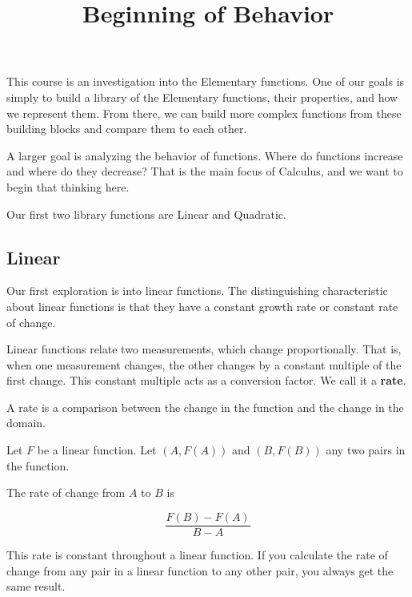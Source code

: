 \documentclass{ximera}
\title{Beginning of Behavior}
\begin{document}
\begin{abstract}
\end{abstract}
\maketitle





This course is an investigation into the Elementary functions.  One of our goals is simply to build a library of the Elementary functions, their properties, and how we represent them.  From there, we can build more complex functions from these building blocks and compare them to each other. 

A larger goal is analyzing the behavior of functions. Where do functions increase and where do they decrease?  That is the main focus of Calculus, and we want to begin that thinking here.


Our first two library functions are Linear and Quadratic. 



\subsection*{Linear}

Our first exploration is into linear functions. The distinguishing characteristic about linear functions is that they have a constant growth rate or constant rate of change.  




Linear functions relate two measurements, which change proportionally.  That is, when one measurement changes, the other changes by a constant multiple of the first change.  This constant multiple acts as a conversion factor.  We call it a \textbf{\textcolor{purple!85!blue}{rate}}. 


A rate is a comparison between the change in the function and the change in the domain.


Let $F$ be a linear function.  Let $(A, F(A))$ and $(B, F(B))$ any two pairs in the function.

The rate of change from $A$ to $B$ is 

\[
\frac{F(B) - F(A)}{B-A}
\]

This rate is constant throughout a linear function. If you calculate the rate of change from any pair in a linear function to any other pair, you always get the same result.
\end{document}
